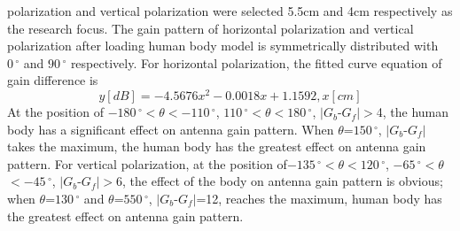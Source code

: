 \documentclass[journal]{IEEEtran}
\begin{document}
polarization and vertical polarization were selected 5.5cm and 4cm respectively as the research focus.
The gain pattern of horizontal polarization and vertical polarization after loading human body model is symmetrically
distributed with  $0\,^{\circ}$ and $90\,^{\circ}$ respectively. For horizontal polarization, the fitted curve equation of
gain difference is
\begin{equation}
\label{eq:eps_5}
y[dB]=-4.5676x^2-0.0018x+1.1592, x[cm]
\end{equation}
At the position of $-180\,^{\circ}$$<$$\theta$$<$$-110\,^{\circ}$,
$110\,^{\circ}$$<$$\theta$$<$$180\,^{\circ}$, $\mid$$G_{b}$-$G_{f}$$\mid$$>$4, the human body has a
significant effect on antenna gain pattern. When $\theta$=$150\,^{\circ}$, $\mid$$G_{b}$-$G_{f}$$\mid$ takes the maximum, the
human body has the greatest effect on antenna gain pattern. For vertical polarization, at the position
of$-135\,^{\circ}$$<$$\theta$$<$$120\,^{\circ}$, $-65\,^{\circ}$$<$$\theta$$<$$-45\,^{\circ}$,
$\mid$$G_{b}$-$G_{f}$$\mid$$>$6, the effect of the body on antenna gain pattern is obvious; when
$\theta$=$130\,^{\circ}$ and $\theta$=$550\,^{\circ}$, $\mid$$G_{b}$-$G_{f}$$\mid$=12, reaches the maximum, human body has the
greatest effect on antenna gain pattern.
\end{document}
